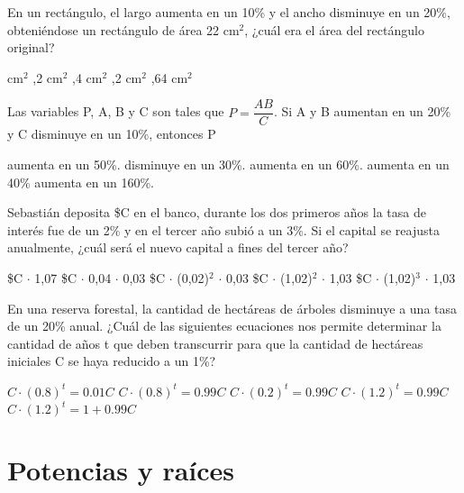 \documentclass[pagina vacia]{srs}
\begin{document}
\begin{preguntas}[after-item-skip=2cm]
\pregunta En un rectángulo, el largo aumenta en un 10\% y el ancho disminuye en un 20\%, obteniéndose un rectángulo de área 22 cm\(^2\), ¿cuál era el área del rectángulo original?
\begin{vertical}
 cm\(^2\)
,2 cm\(^2\)
,4 cm\(^2\)
,2 cm\(^2\)
,64 cm\(^2\)
\end{vertical}

\pregunta Las variables P, A, B y C son tales que \( P = \dfrac{AB}{C} \). Si A y B aumentan en un 20\% y C disminuye en un 10\%, entonces P
\begin{vertical}
\alternativa aumenta en un 50\%.
\alternativa disminuye en un 30\%.
\alternativa aumenta en un 60\%.
\alternativa aumenta en un 40\%
\alternativa aumenta en un 160\%.
\end{vertical}

\pregunta Sebastián deposita \$C en el banco, durante los dos primeros años la tasa de interés fue de un 2\% y en el tercer año subió a un 3\%. Si el capital se reajusta anualmente, ¿cuál será el nuevo capital a fines del tercer año?
\begin{vertical}
\alternativa \$C \(\cdot\) 1,07
\alternativa \$C \(\cdot\) 0,04 \(\cdot\) 0,03
\alternativa \$C \(\cdot\) (0,02)\(^2\) \(\cdot\) 0,03
\alternativa \$C \(\cdot\) (1,02)\(^2\) \(\cdot\) 1,03
\alternativa \$C \(\cdot\) (1,02)\(^3\) \(\cdot\) 1,03
\end{vertical}

\pregunta En una reserva forestal, la cantidad de hectáreas de árboles disminuye a una tasa de un 20\% anual. ¿Cuál de las siguientes ecuaciones nos permite determinar la cantidad de años t que deben transcurrir para que la cantidad de hectáreas iniciales C se haya reducido a un 1\%?
\begin{vertical}
\alternativa \( C \cdot (0.8)^t = 0.01 C \)
\alternativa \( C \cdot (0.8)^t = 0.99 C \)
\alternativa \( C \cdot (0.2)^t = 0.99 C \)
\alternativa \( C \cdot (1.2)^t = 0.99 C \)
\alternativa \( C \cdot (1.2)^t = 1+0.99 C \)
\end{vertical}

\end{preguntas}

\section{Potencias y raíces}
\end{document}
